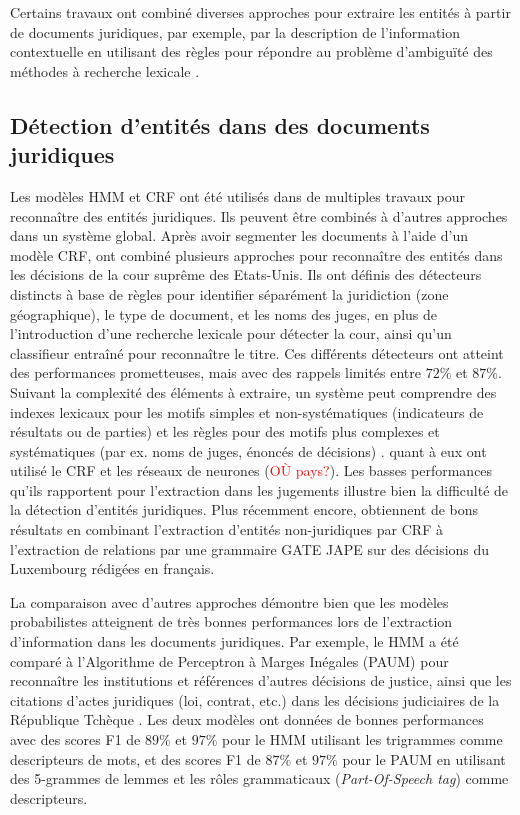 Certains travaux ont combiné diverses approches pour extraire les entités à partir de documents juridiques,  par exemple,  par la description de l'information contextuelle en utilisant des règles pour répondre au problème d'ambiguïté des méthodes à recherche lexicale \citep{mikheev1999NERlexicalWithRules,hanisch2005prominer}. 

\subsection{Détection d'entités dans des documents juridiques}

Les modèles HMM et CRF ont été utilisés dans de multiples travaux pour reconnaître des entités juridiques. Ils peuvent être combinés à d'autres approches dans un système global. Après avoir segmenter les documents à l'aide d'un modèle CRF, \citet{dozier2010legalnerr} ont combiné plusieurs approches pour reconnaître des entités dans les décisions de la cour suprême des Etats-Unis. Ils ont définis des détecteurs distincts à base de règles pour identifier séparément la juridiction (zone géographique), le type de document, et les noms des juges, en plus de l'introduction d'une recherche lexicale pour détecter la cour, ainsi qu'un classifieur entraîné pour reconnaître le titre. Ces différents détecteurs ont atteint des performances prometteuses, mais avec des rappels limités entre $ 72 \% $ et $ 87 \% $. Suivant la complexité des éléments à extraire, un système peut comprendre des indexes lexicaux pour les motifs simples et non-systématiques (indicateurs de résultats ou de parties) et les règles pour des motifs plus complexes et systématiques (par ex. noms de juges, énoncés de décisions) \citep{Waltl2016lexia, wyner2010extractlegalelts}. \cite{cardellino2017legalNERCL} quant à eux ont utilisé le CRF et les réseaux de neurones (\textcolor{red}{OÙ pays?}). Les basses performances qu'ils rapportent pour l'extraction dans les jugements illustre bien la difficulté de la détection d'entités juridiques. Plus récemment encore, \citet{andrew2018legalNerAndRelation} obtiennent de bons résultats en combinant l'extraction d'entités non-juridiques par CRF à l'extraction de relations par une grammaire GATE JAPE \citep{thakker2009gatejape} sur des décisions du Luxembourg rédigées en français.

La comparaison avec d'autres approches démontre bien que les modèles probabilistes atteignent de très bonnes performances lors de l'extraction d'information dans les documents juridiques. Par exemple, le HMM a été comparé à l'Algorithme de Perceptron à Marges Inégales (PAUM) \citep{li2002PAUM} pour reconnaître les institutions et références d'autres décisions de justice, ainsi que les citations d'actes juridiques (loi, contrat, etc.) dans les décisions judiciaires de la République Tchèque \citep{Kriz2014nerinczechdecisions}. Les deux modèles ont données de bonnes performances avec des scores F1 de $ 89 \% $ et $ 97 \% $ pour le HMM utilisant les trigrammes comme descripteurs de mots, et des scores F1 de $ 87 \% $ et $ 97 \% $ pour le PAUM en utilisant des 5-grammes de lemmes et les rôles grammaticaux (\textit{Part-Of-Speech tag}) comme descripteurs. 

